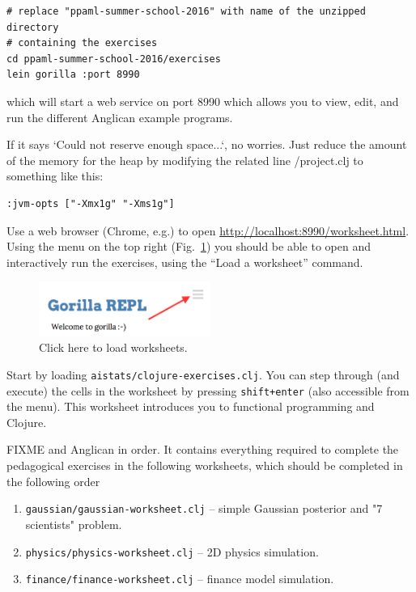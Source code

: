 \documentclass{article}
\begin{document}
\begin{verbatim}
# replace "ppaml-summer-school-2016" with name of the unzipped directory
# containing the exercises
cd ppaml-summer-school-2016/exercises
lein gorilla :port 8990
\end{verbatim}
which will start a web service on port 8990 which allows you to view, edit, and run
the different Anglican example programs.

\vspace{5mm}

\noindent If it says `Could not reserve enough space...`, no worries. Just reduce the amount of the memory for the heap by modifying the related line /project.clj to something like this:
\vspace{-2mm}
\begin{verbatim}
:jvm-opts ["-Xmx1g" "-Xms1g"] 
\end{verbatim}

\vspace{2mm}

\noindent Use a web browser (Chrome, e.g.) to open \url{http://localhost:8990/worksheet.html}.
Using the menu on the top right (Fig.~\ref{gorilla_hint}) you should be able to open and interactively run the exercises,
using the ``Load a worksheet'' command.

\begin{figure}[htbp]
\begin{center}
\includegraphics[width=0.5\textwidth]{gorilla_hint.png}
\caption{Click here to load worksheets.}
\label{gorilla_hint}
\end{center}
\end{figure}


Start by loading \texttt{aistats/clojure-exercises.clj}.
You can step through (and execute) the cells in the worksheet by pressing \texttt{shift+enter} (also accessible from the menu).  
This worksheet introduces you to functional programming and Clojure.

FIXME and Anglican in order.  It contains everything required to
complete the pedagogical exercises in the following worksheets, which should be completed in the following order

\begin{enumerate}
\item  \texttt{gaussian/gaussian-worksheet.clj} {\small -- simple Gaussian posterior and "7 scientists" problem.}
\item  \texttt{physics/physics-worksheet.clj} {\small -- 2D physics simulation.}
\item  \texttt{finance/finance-worksheet.clj} {\small -- finance model simulation.}

\end{enumerate}
\end{document}
